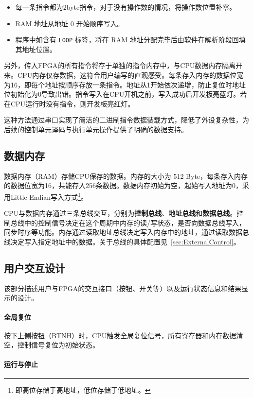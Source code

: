 \documentclass[lang=cn,a4paper,newtx]{elegantpaper}
\begin{document}
\begin{itemize}
  \item 每一条指令都为2byte指令，对于没有操作数的情况，将操作数位置补零。
  \item RAM 地址从地址 0 开始顺序写入。
  \item 程序中如含有 \texttt{LOOP} 标签，将在 RAM 地址分配完毕后由软件在解析阶段回填其地址位置。
\end{itemize}

另外，传入FPGA的所有指令将存于单独的指令内存中，与CPU数据内存隔离开来。CPU内存仅存数据，这符合用户编写的直观感受。每条存入内存的数据位宽为16，即每个地址按顺序存放一条指令。地址从1开始依次递增，防止复位时地址位初始化为0导致出错。指令写入在CPU开机之前，写入成功后开发板亮蓝灯。若在CPU运行时没有指令，则开发板亮红灯。

这种方法通过串口实现了简洁的二进制指令数据装载方式，降低了外设复杂性，为后续的控制单元译码与执行单元操作提供了明确的数据支持。


\subsection{数据内存}
数据内存（RAM）存储CPU保存的数据。内存的大小为 512 Byte，每条存入内存的数据位宽为16，共能存入256条数据。数据内存初始为空，起始写入地址为0，采用Little Endian写入方式\footnote{即高位存储于高地址，低位存储于低地址。}。

CPU与数据内存通过三条总线交互，分别为\textbf{控制总线}、\textbf{地址总线}和\textbf{数据总线}。控制总线中的控制信号决定在这个周期中内存的读/写状态，是否向数据总线写入，同步时序等功能。内存通过读取地址总线决定写入内存中的地址，通过读取数据总线决定写入指定地址中的数据。关于总线的具体配置见~\ref{sec:ExternalControl}。


\subsection{用户交互设计}\label{sec:interaction}
该部分描述用户与FPGA的交互接口（按钮、开关等）以及运行状态信息和结果显示的设计。

\paragraph{全局复位}

按下上侧按钮（BTNH）时，CPU触发全局复位信号，所有寄存器和内存数据清空，控制信号复位为初始状态。

\paragraph{运行与停止}
\end{document}

